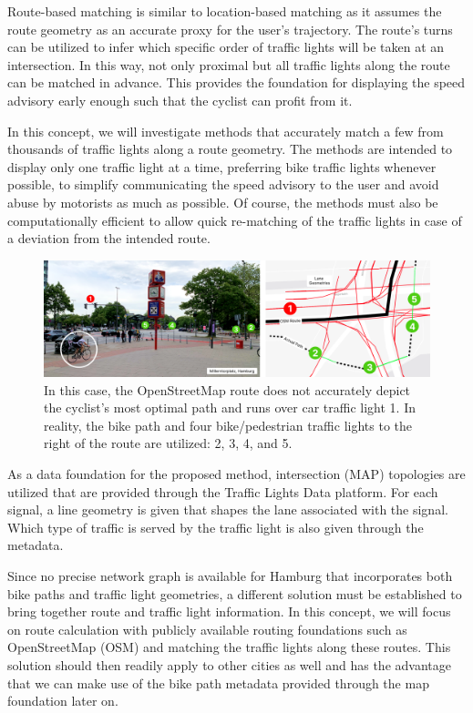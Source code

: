 Route-based matching is similar to location-based matching as it assumes the route geometry as an accurate proxy for the user's trajectory. The route's turns can be utilized to infer which specific order of traffic lights will be taken at an intersection. In this way, not only proximal but all traffic lights along the route can be matched in advance. This provides the foundation for displaying the speed advisory early enough such that the cyclist can profit from it. 

In this concept, we will investigate methods that accurately match a few from thousands of traffic lights along a route geometry. The methods are intended to display only one traffic light at a time, preferring bike traffic lights whenever possible, to simplify communicating the speed advisory to the user and avoid abuse by motorists as much as possible. Of course, the methods must also be computationally efficient to allow quick re-matching of the traffic lights in case of a deviation from the intended route.

\begin{figure}[htbp]
\centering
\includegraphics[width=\linewidth]{images/sg-selection-example.png}
\caption{In this case, the OpenStreetMap route does not accurately depict the cyclist's most optimal path and runs over car traffic light 1. In reality, the bike path and four bike/pedestrian traffic lights to the right of the route are utilized: 2, 3, 4, and 5.}
\label{fig:sg-selection-example}
\end{figure}

As a data foundation for the proposed method, intersection (MAP) topologies are utilized that are provided through the Traffic Lights Data platform. For each signal, a line geometry is given that shapes the lane associated with the signal. Which type of traffic is served by the traffic light is also given through the metadata.

Since no precise network graph is available for Hamburg that incorporates both bike paths and traffic light geometries, a different solution must be established to bring together route and traffic light information. In this concept, we will focus on route calculation with publicly available routing foundations such as OpenStreetMap (OSM) and matching the traffic lights along these routes. This solution should then readily apply to other cities as well and has the advantage that we can make use of the bike path metadata provided through the map foundation later on.

